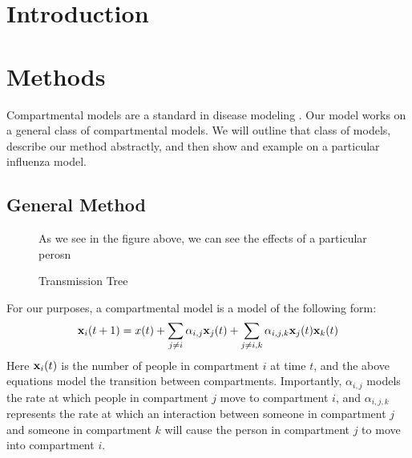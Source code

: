 \documentclass{article}
\renewcommand{\vec}[1]{{\textbf #1}}
\begin{document}
\section{Introduction}
\section{Methods}
Compartmental models are a standard in disease modeling \cite{}.%
Our model works on a general class of compartmental models.  We will outline that class of models, describe our method abstractly, and then show and example on a particular influenza model.


\subsection*{General Method}

\begin{figure}
\caption{Transmission Tree}
As we see in the figure above, we can see the effects of a particular perosn 
\end{figure}

For our purposes, a compartmental model is a model of the following form:
\begin{align*}
\vec{x}_i(t+1) = x(t) + \sum_{j \neq i} \alpha_{i,j} \vec{x}_j(t) +  \sum_{j \neq i,k} \alpha_{i,j,k} \vec{x}_j(t) \vec x_k(t)
\end{align*}
Here $\vec x_i(t)$ is the number of people in compartment $i$ at time $t$, and the above equations model the transition between compartments.  Importantly, $\alpha_{i,j}$ models the rate at which people in compartment $j$ move to compartment $i$, and $\alpha_{i,j,k}$ represents the rate at which an interaction between someone in compartment $j$ and someone in compartment $k$ will cause the person in compartment $j$ to move into compartment $i$.
\end{document}

